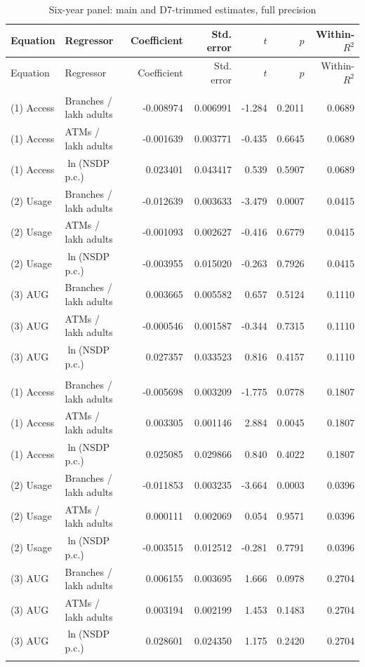 {\footnotesize
\begin{longtable}{@{}llrrrrr@{}}
\caption{Six-year panel: main and D7-trimmed estimates, full precision}
\label{tab:app-6yr}\\
\toprule
Equation & Regressor & Coefficient & Std. error & $t$ & $p$ & Within-$R^2$ \\
\midrule
\endfirsthead
\toprule
Equation & Regressor & Coefficient & Std. error & $t$ & $p$ & Within-$R^2$ \\
\midrule
\endhead
\bottomrule
\endlastfoot
\multicolumn{7}{@{}l}{\textbf{Six-year panel, main}} \\[2pt]
(1) Access & Branches / lakh adults & -0.008974 & 0.006991 & -1.284 & 0.2011 & 0.0689 \\
(1) Access & ATMs / lakh adults & -0.001639 & 0.003771 & -0.435 & 0.6645 & 0.0689 \\
(1) Access & $\ln$(NSDP p.c.) & 0.023401 & 0.043417 & 0.539 & 0.5907 & 0.0689 \\
(2) Usage & Branches / lakh adults & -0.012639 & 0.003633 & -3.479 & 0.0007 & 0.0415 \\
(2) Usage & ATMs / lakh adults & -0.001093 & 0.002627 & -0.416 & 0.6779 & 0.0415 \\
(2) Usage & $\ln$(NSDP p.c.) & -0.003955 & 0.015020 & -0.263 & 0.7926 & 0.0415 \\
(3) AUG & Branches / lakh adults & 0.003665 & 0.005582 & 0.657 & 0.5124 & 0.1110 \\
(3) AUG & ATMs / lakh adults & -0.000546 & 0.001587 & -0.344 & 0.7315 & 0.1110 \\
(3) AUG & $\ln$(NSDP p.c.) & 0.027357 & 0.033523 & 0.816 & 0.4157 & 0.1110 \\
\addlinespace
\multicolumn{7}{@{}l}{\textbf{Six-year panel, D7-trimmed}} \\[2pt]
(1) Access & Branches / lakh adults & -0.005698 & 0.003209 & -1.775 & 0.0778 & 0.1807 \\
(1) Access & ATMs / lakh adults & 0.003305 & 0.001146 & 2.884 & 0.0045 & 0.1807 \\
(1) Access & $\ln$(NSDP p.c.) & 0.025085 & 0.029866 & 0.840 & 0.4022 & 0.1807 \\
(2) Usage & Branches / lakh adults & -0.011853 & 0.003235 & -3.664 & 0.0003 & 0.0396 \\
(2) Usage & ATMs / lakh adults & 0.000111 & 0.002069 & 0.054 & 0.9571 & 0.0396 \\
(2) Usage & $\ln$(NSDP p.c.) & -0.003515 & 0.012512 & -0.281 & 0.7791 & 0.0396 \\
(3) AUG & Branches / lakh adults & 0.006155 & 0.003695 & 1.666 & 0.0978 & 0.2704 \\
(3) AUG & ATMs / lakh adults & 0.003194 & 0.002199 & 1.453 & 0.1483 & 0.2704 \\
(3) AUG & $\ln$(NSDP p.c.) & 0.028601 & 0.024350 & 1.175 & 0.2420 & 0.2704 \\
\addlinespace
\end{longtable}
}

